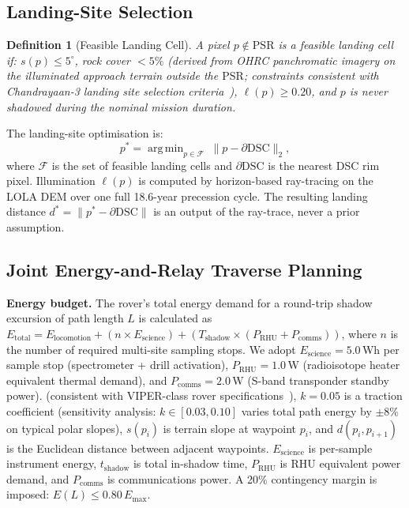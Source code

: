 \documentclass[10pt,conference]{IEEEtran}
\newtheorem{definition}{Definition}
\newcommand{\PSR}{\mathrm{PSR}}
\newcommand{\DSC}{\mathrm{DSC}}
\DeclareMathOperator*{\argmin}{arg\,min}
\begin{document}
\subsection{Landing-Site Selection}
\label{sec:method:landing}

\begin{definition}[Feasible Landing Cell]
A pixel $p \notin \PSR$ is a feasible landing cell if:
$s(p) \le 5^\circ$, rock cover $< 5\%$ (derived from OHRC panchromatic
imagery on the illuminated approach terrain outside the $\PSR$; constraints
consistent with Chandrayaan-3 landing site selection criteria~\cite{prasad2023characterization}),
$\ell(p) \ge 0.20$, and $p$ is never shadowed during the nominal
mission duration.
\end{definition}

The landing-site optimisation is:
\begin{equation}
p^* = \argmin_{p \in \mathcal{F}} \;\|p - \partial\DSC\|_2,
\label{eq:landingopt}
\end{equation}
where $\mathcal{F}$ is the set of feasible landing cells and
$\partial\DSC$ is the nearest DSC rim pixel.
Illumination $\ell(p)$ is computed by horizon-based ray-tracing on
the LOLA DEM over one full 18.6-year precession cycle.
The resulting landing distance $d^* = \|p^* - \partial\DSC\|$ is an
output of the ray-trace, never a prior assumption.

\subsection{Joint Energy-and-Relay Traverse Planning}
\label{sec:method:traverse}

\textbf{Energy budget.}
The rover's total energy demand for a round-trip shadow excursion of
path length $L$ is calculated as $E_{\mathrm{total}} = E_{\mathrm{locomotion}} + (n \times E_{\mathrm{science}}) + (T_{\mathrm{shadow}} \times (P_{\mathrm{RHU}} + P_{\mathrm{comms}}))$, where $n$ is the number of required multi-site sampling stops. We adopt $E_{\mathrm{science}} = 5.0$\,Wh per sample stop (spectrometer + drill activation), $P_{\mathrm{RHU}} = 1.0$\,W (radioisotope heater equivalent thermal demand), and $P_{\mathrm{comms}} = 2.0$\,W (S-band transponder standby power).
(consistent with VIPER-class rover specifications~\cite{colaprete2019viper}),
$k = 0.05$ is a traction coefficient (sensitivity analysis:
$k \in [0.03, 0.10]$ varies total path energy by $\pm8\%$ on
typical polar slopes), $s(p_i)$ is terrain slope at waypoint $p_i$,
and $d(p_i, p_{i+1})$ is the Euclidean distance between
adjacent waypoints.
$E_{\mathrm{science}}$ is per-sample instrument energy,
$t_{\mathrm{shadow}}$ is total in-shadow time,
$P_{\mathrm{RHU}}$ is RHU equivalent power demand, and
$P_{\mathrm{comms}}$ is communications power.
A 20\% contingency margin is imposed: $E(L) \le 0.80\,E_{\max}$.
\end{document}
